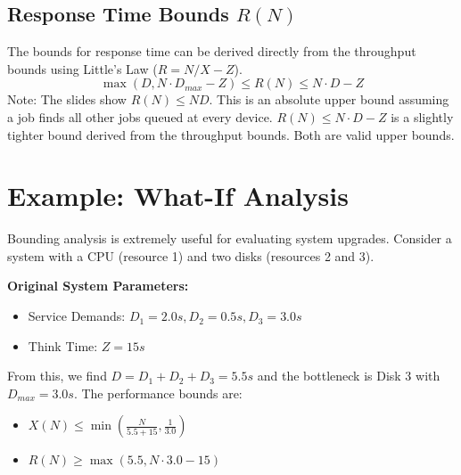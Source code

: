 \subsection{Response Time Bounds $R(N)$}
The bounds for response time can be derived directly from the throughput bounds using Little's Law ($R = N/X - Z$).
\begin{equation}
    \max(D, N \cdot D_{max} - Z) \le R(N) \le N \cdot D - Z 
\end{equation}
Note: The slides show $R(N) \le ND$. This is an absolute upper bound assuming a job finds all other jobs queued at every device. $R(N) \le N \cdot D - Z$ is a slightly tighter bound derived from the throughput bounds. Both are valid upper bounds.


\section{Example: What-If Analysis}
Bounding analysis is extremely useful for evaluating system upgrades. Consider a system with a CPU (resource 1) and two disks (resources 2 and 3).

\textbf{Original System Parameters:}
\begin{itemize}
    \item Service Demands: $D_1=2.0s, D_2=0.5s, D_3=3.0s$
    \item Think Time: $Z = 15s$
\end{itemize}
From this, we find $D = D_1+D_2+D_3 = 5.5s$ and the bottleneck is Disk 3 with $D_{max}=3.0s$. The performance bounds are:
\begin{itemize}
    \item $X(N) \le \min\left(\frac{N}{5.5+15}, \frac{1}{3.0}\right)$
    \item $R(N) \ge \max(5.5, N \cdot 3.0 - 15)$
\end{itemize}


